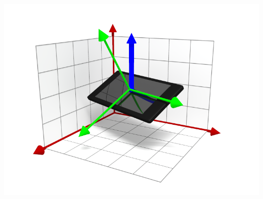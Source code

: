 \documentclass[xcolor=svgnames,english,presentation]{beamer}
\begin{document}
\begin{frame}
\begin{columns}
\begin{column}{0.4\textwidth}
  \includegraphics[width=\columnwidth]{grav}
  \end{column}
  \end{columns}
\end{frame}
\end{document}
